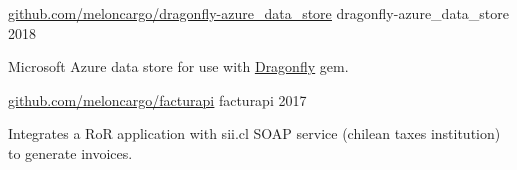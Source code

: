 

\begin{cventries}

  \cventry
    {\href{https://github.com/meloncargo/dragonfly-azure_data_store}{\underline{github.com/meloncargo/dragonfly-azure\_data\_store}}} %
    {dragonfly-azure\_data\_store} %
    {} %
    {2018} %
    {
      \begin{cvitems} %
        \item { Microsoft Azure data store for use with
                \href{http://github.com/markevans/dragonfly}{\underline{Dragonfly}}
                gem. }
      \end{cvitems}
    }

  \cventry
    {\href{https://github.com/meloncargo/facturapi}{\underline{github.com/meloncargo/facturapi}}} %
    {facturapi} %
    {} %
    {2017} %
    {
      \begin{cvitems} %
        \item { Integrates a RoR application with sii.cl SOAP service (chilean
                taxes institution) to generate invoices. }
      \end{cvitems}
    }

\end{cventries}
